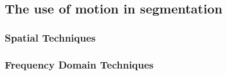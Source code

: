 \subsection{The use of motion in segmentation}
\subsubsection{Spatial Techniques}
\subsubsection{Frequency Domain Techniques}
